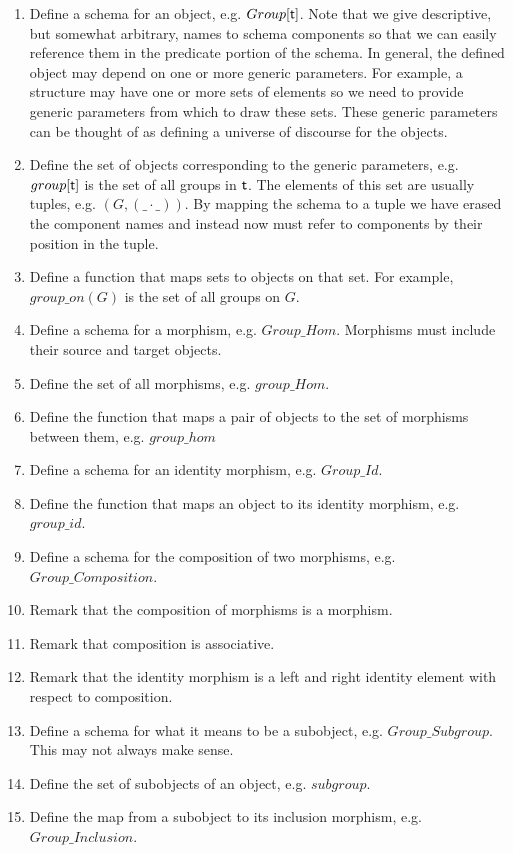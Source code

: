 \documentclass{amsart}
\begin{document}
\begin{enumerate}
	\item Define a schema for an object, e.g. $Group[\mathsf{t}]$. 
	Note that we give descriptive, but somewhat arbitrary, names to schema components 
	so that we can easily reference them in the predicate portion of the schema.
	In general, the defined object may depend on one or more generic parameters. 
	For example, a structure may have one or more sets of elements so we need to provide
	generic parameters from which to draw these sets.
	These generic parameters can be thought of as defining a universe of discourse for the objects.
	\item Define the set of objects corresponding to the generic parameters, e.g. $group[\mathsf{t}]$
	is the set of all groups in $\mathsf{t}$.
	The elements of this set are usually tuples, e.g. $(G, (\_ \cdot \_))$. 
	By mapping the schema to a tuple we have erased the component names and 
	instead now must refer to components by their position in the tuple.
	\item Define a function that maps sets to objects on that set. For example, $group\_on(G)$
	is the set of all groups on $G$.
	\item Define a schema for a morphism, e.g. $Group\_Hom$.
	Morphisms must include their source and target objects.
	\item Define the set of all morphisms, e.g. $group\_Hom$.
	\item Define the function that maps a pair of objects to the set of morphisms between them,
	e.g. $group\_hom$
	\item Define a schema for an identity morphism, e.g. $Group\_Id$.
	\item Define the function that maps an object to its identity morphism, e.g. $group\_id$.
	\item Define a schema for the composition of two morphisms, e.g. $Group\_Composition$.
	\item Remark that the composition of morphisms is a morphism.
	\item Remark that composition is associative.
	\item Remark that the identity morphism is a left and right identity element with respect to
	composition.
	\item Define a schema for what it means to be a subobject, e.g. $Group\_Subgroup$. 
	This may not always make sense.
	\item Define the set of subobjects of an object, e.g. $subgroup$.
	\item Define the map from a subobject to its inclusion morphism, e.g. $Group\_Inclusion$.

\end{enumerate}
\end{document}
